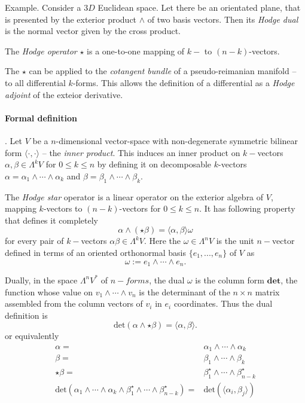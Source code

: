 Example. Consider a $3D$ Euclidean space. Let there be an orientated plane, that is presented by the exterior product $\wedge$ of two basis vectors. Then its \textit{Hodge dual} is the normal vector given by the cross product. 

The \textit{Hodge operator} $\star$ is a one-to-one mapping of $k-$ to $(n-k)$-vectors.

The $\star$ can be applied to the \textit{cotangent bundle} of a pseudo-reimanian manifold -- to all differential $k$-forms. This allows the definition of a differential as a \textit{Hodge adjoint} of the exteior derivative. 

\paragraph{Formal definition}. Let $V$ be a $n$-dimensional vector-space with non-degenerate symmetric bilinear form $\langle\cdot,\cdot\rangle$ -- the \textit{inner product}. 
This induces an inner product on $k-$vectors $\alpha,\beta\in\Lambda^k V$ for $0\leq k \leq n$ by defining it on decomposable $k$-vectors $\alpha = \alpha_1\wedge\cdots\wedge\alpha_k$ and $\beta=\beta_1\wedge\cdots\wedge\beta_k$.

The \textit{Hodge star} operator is a linear operator on the exterior algebra of $V$, mapping $k$-vectors to $(n-k)$-vectors for $0\leq k \leq n$. It has following property that defines it completely
\begin{equation}
\alpha\wedge(\star\beta) = \langle\alpha,\beta\rangle\omega 
\end{equation}
for every pair of $k-$vectors $\alpha\beta\in\Lambda^kV$.
Here the $\omega\in\Lambda^nV$ is the unit $n-$vector defined in terms of an oriented orthonormal basis $\{e_1,...,e_n\}$ of $V$ as
\begin{equation}
\omega := e_1 \wedge \cdots \wedge e_n.
\end{equation}

Dually, in the space $\Lambda^n V^*$ of $n-forms$, the dual $\omega$ is the column form $\textbf{det}$, the function whose value on $v_1\wedge\cdots\wedge v_n$ is the determinant of the $n\times n$ matrix assembled from the column vectors of $v_i$ in $e_i$ coordinates. Thus the dual definition is 
\begin{equation}
\text{det}(\alpha\wedge\star\beta) = \langle\alpha,\beta\rangle.
\end{equation}
or equivalently 
\begin{align}
\alpha =& \alpha_1\wedge\cdots\wedge\alpha_k \\
\beta =& \beta_1\wedge\cdots\wedge\beta_k \\
\star\beta =& \beta_1 ^{\star} \wedge\cdots\wedge \beta_{n-k} ^ {\star} \\
\text{det}(\alpha_1\wedge\cdots\wedge\alpha_k\wedge\beta_1 ^{\star}\wedge\cdots\wedge\beta_{n-k}^{\star}) =& \text{det}(\langle\alpha_i,\beta_j\rangle)
\end{align}

